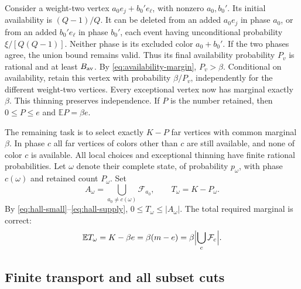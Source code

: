 \documentclass[11pt]{article}
\theoremstyle{definition}
\theoremstyle{remark}
\begin{document}
Consider a weight-two vertex $a_0e_j+b_0'e_\ell$, with nonzero
$a_0,b_0'$.  Its initial availability is $(Q-1)/Q$.  It can be deleted
from an added $a_0e_j$ in phase $a_0$, or from an added $b_0'e_\ell$ in
phase $b_0'$, each event having unconditional probability
$\xi/[Q(Q-1)]$.  Neither phase is its excluded color $a_0+b_0'$.
If the two phases agree, the union bound remains valid.  Thus its final
availability probability $P_v$ is rational and at least $B_{\rm av}$.
By \eqref{eq:availability-margin}, $P_v>\beta$.
Conditional on availability, retain this vertex with probability
$\beta/P_v$, independently for the different weight-two vertices.
Every exceptional vertex now has marginal exactly $\beta$.
This thinning preserves independence.  If $P$ is the number retained,
then $0\le P\le e$ and $\mathbb E P=\beta e$.

The remaining task is to select exactly $K-P$ far vertices with common
marginal $\beta$.  In phase $c$ all far vertices of colors other than
$c$ are still available, and none of color $c$ is available.  All local
choices and exceptional thinning have finite rational probabilities.
Let $\omega$ denote their complete state, of probability $p_\omega$,
with phase $c(\omega)$ and retained count $P_\omega$.  Set
\[
 A_\omega=\bigcup_{a_0\ne c(\omega)}\mathcal F_{a_0},
 \qquad T_\omega=K-P_\omega.
\]
By \eqref{eq:hall-small}--\eqref{eq:hall-supply},
$0\le T_\omega\le|A_\omega|$.  The total required marginal is correct:
\begin{equation}
 \mathbb E T_\omega=K-\beta e
                  =\beta(m-e)=\beta\Bigl|\bigcup_c\mathcal F_c\Bigr|.
 \label{eq:expected-supply}
\end{equation}

\subsection{Finite transport and all subset cuts}
\end{document}
